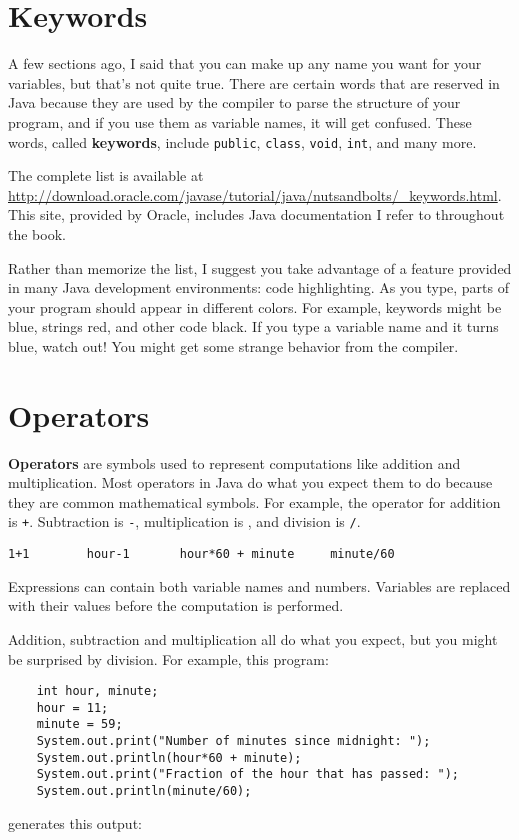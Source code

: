 \documentclass[12pt]{book}
\theoremstyle{definition}
\begin{document}
\section{Keywords}

A few sections ago, I said that you can make up any name you
want for your variables, but that's not quite true.  There
are certain words that are reserved in Java because they are
used by the compiler to parse the structure of your program,
and if you use them as variable names, it will get confused.
These words, called {\bf keywords}, include {\tt public},
{\tt class}, {\tt void}, {\tt int}, and many more.

The complete list is available at \url{http://download.oracle.com/javase/tutorial/java/nutsandbolts/_keywords.html}.
This site, provided by Oracle, includes Java documentation I refer to
throughout the book.

Rather than memorize the list, I suggest you
take advantage of a feature provided in many Java development
environments: code highlighting.  As you type,
parts of your program should appear in different colors.  For
example, keywords might be blue, strings red, and other code
black.  If you type a variable name and it turns blue, watch
out!  You might get some strange behavior from the compiler.


\section{Operators}

{\bf Operators} are symbols used to represent
computations like addition and multiplication.  Most
operators in Java do what you expect them
to do because they are common mathematical symbols.  For
example, the operator for addition is {\tt +}.  Subtraction
is {\tt -}, multiplication is {\tt *}, and division is {\tt /}.

\begin{lstlisting}
1+1        hour-1       hour*60 + minute     minute/60
\end{lstlisting}
%
Expressions can contain both variable
names and numbers.  Variables are
replaced with their values before the computation is performed.


Addition, subtraction and multiplication all do what you
expect, but you might be surprised by division.  For example,
this program:

\begin{lstlisting}
    int hour, minute;
    hour = 11;
    minute = 59;
    System.out.print("Number of minutes since midnight: ");
    System.out.println(hour*60 + minute);
    System.out.print("Fraction of the hour that has passed: ");
    System.out.println(minute/60);
\end{lstlisting}
%
generates this output:
\end{document}
